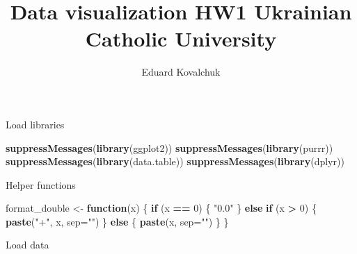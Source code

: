\documentclass[]{article}
\title{Data visualization HW1 \textbar{} Ukrainian Catholic University}
\author{Eduard Kovalchuk}
\date{}
\newenvironment{Shaded}{\begin{snugshade}}{\end{snugshade}}
\newcommand{\ControlFlowTok}[1]{\textcolor[rgb]{0.13,0.29,0.53}{\textbf{#1}}}
\newcommand{\DataTypeTok}[1]{\textcolor[rgb]{0.13,0.29,0.53}{#1}}
\newcommand{\DecValTok}[1]{\textcolor[rgb]{0.00,0.00,0.81}{#1}}
\newcommand{\KeywordTok}[1]{\textcolor[rgb]{0.13,0.29,0.53}{\textbf{#1}}}
\newcommand{\NormalTok}[1]{#1}
\newcommand{\OperatorTok}[1]{\textcolor[rgb]{0.81,0.36,0.00}{\textbf{#1}}}
\newcommand{\StringTok}[1]{\textcolor[rgb]{0.31,0.60,0.02}{#1}}
\begin{document}
\maketitle

Load libraries

\begin{Shaded}
\begin{Highlighting}[]
\KeywordTok{suppressMessages}\NormalTok{(}\KeywordTok{library}\NormalTok{(ggplot2))}
\KeywordTok{suppressMessages}\NormalTok{(}\KeywordTok{library}\NormalTok{(purrr))}
\KeywordTok{suppressMessages}\NormalTok{(}\KeywordTok{library}\NormalTok{(data.table))}
\KeywordTok{suppressMessages}\NormalTok{(}\KeywordTok{library}\NormalTok{(dplyr))}
\end{Highlighting}
\end{Shaded}

Helper functions

\begin{Shaded}
\begin{Highlighting}[]
\NormalTok{format_double <-}\StringTok{ }\ControlFlowTok{function}\NormalTok{(x) \{}
  \ControlFlowTok{if}\NormalTok{ (x }\OperatorTok{==}\StringTok{ }\DecValTok{0}\NormalTok{) \{}
    \StringTok{"0.0"}
\NormalTok{  \} }\ControlFlowTok{else} \ControlFlowTok{if}\NormalTok{ (x }\OperatorTok{>}\StringTok{ }\DecValTok{0}\NormalTok{) \{}
    \KeywordTok{paste}\NormalTok{(}\StringTok{"+"}\NormalTok{, x, }\DataTypeTok{sep=}\StringTok{""}\NormalTok{)}
\NormalTok{  \} }\ControlFlowTok{else}\NormalTok{ \{}
    \KeywordTok{paste}\NormalTok{(x, }\DataTypeTok{sep=}\StringTok{""}\NormalTok{)}
\NormalTok{  \}}
\NormalTok{\}}
\end{Highlighting}
\end{Shaded}

Load data
\end{document}
